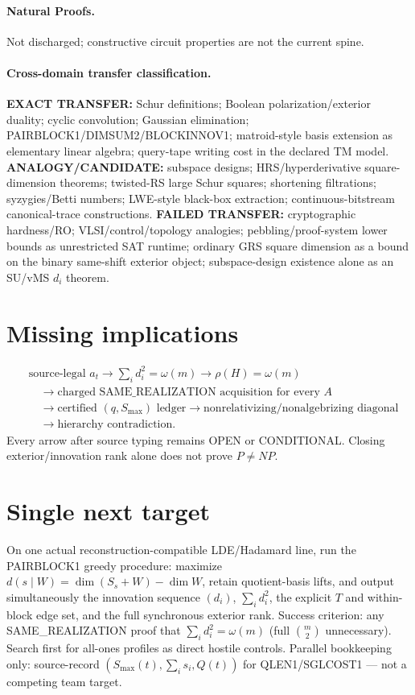 \documentclass[11pt]{article}
\begin{document}
\paragraph{Natural Proofs.}
Not discharged; constructive circuit properties are not the current spine.
\paragraph{Cross-domain transfer classification.}
\textbf{EXACT TRANSFER:} Schur definitions; Boolean polarization/exterior duality; cyclic convolution;
Gaussian elimination; PAIRBLOCK1/DIMSUM2/BLOCKINNOV1; matroid-style basis extension as elementary
linear algebra; query-tape writing cost in the declared TM model.
\textbf{ANALOGY/CANDIDATE:} subspace designs; HRS/hyperderivative square-dimension theorems;
twisted-RS large Schur squares; shortening filtrations; syzygies/Betti numbers; LWE-style
black-box extraction; continuous-bitstream canonical-trace constructions.
\textbf{FAILED TRANSFER:} cryptographic hardness/RO; VLSI/control/topology analogies;
pebbling/proof-system lower bounds as unrestricted SAT runtime; ordinary GRS square dimension
as a bound on the binary same-shift exterior object; subspace-design existence alone as an
SU/vMS $d_i$ theorem.

\section*{Missing implications}
\[
\begin{aligned}
&\text{source-legal }a_t
\to \sum_i d_i^2=\omega(m)
\to \rho(H)=\omega(m)\\
&\quad\to\text{charged SAME\_REALIZATION acquisition for every }A\\
&\quad\to\text{certified }(q,S_{\max})\text{ ledger}
\to\text{nonrelativizing/nonalgebrizing diagonal}\\
&\quad\to\text{hierarchy contradiction}.
\end{aligned}
\]
Every arrow after source typing remains OPEN or CONDITIONAL. Closing exterior/innovation
rank alone does not prove $P\neq NP$.

\section*{Single next target}
On one actual reconstruction-compatible LDE/Hadamard line, run the PAIRBLOCK1 greedy procedure:
maximize $d(s\mid W)=\dim(S_s+W)-\dim W$, retain quotient-basis lifts, and output simultaneously
the innovation sequence $(d_i)$, $\sum_i d_i^2$, the explicit $T$ and within-block edge set, and
the full synchronous exterior rank. Success criterion: any SAME\_REALIZATION proof that
$\sum_i d_i^2=\omega(m)$ (full $\binom{m}{2}$ unnecessary). Search first for all-ones profiles
as direct hostile controls. Parallel bookkeeping only: source-record $(S_{\max}(t),\sum_i s_i,Q(t))$
for QLEN1/SGLCOST1 --- not a competing team target.
\end{document}
